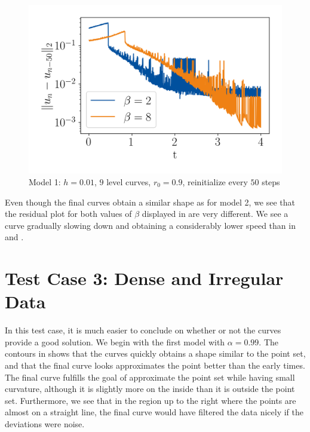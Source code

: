 \begin{figure}
    \centering
    \includegraphics[width=.6\linewidth]{figures/Results/Three-points/model3/b2_b8_res-t4.png}
    \caption[Model 3 - Triangle, Residuals]{Model 1: $h=0.01$, $9$ level curves, $r_0=0.9$, reinitialize every $50$ steps}
    \label{fig:m3-three-res}
\end{figure}


Even though the final curves obtain a similar shape as for model 2, we see that the residual plot for both values of $\beta$ displayed in  are very different. We see a curve gradually slowing down and obtaining a considerably lower speed than in  and . 

\clearpage
\section{Test Case 3: Dense and Irregular Data}
In this test case, it is much easier to conclude on whether or not the curves provide a good solution. We begin with the first model with $\alpha=0.99$. The contours in  shows that the curves quickly obtains a shape similar to the point set, and that the final curve looks approximates the point better than the early times. The final curve fulfills the goal of approximate the point set while having small curvature, although it is slightly more on the inside than it is outside the point set. Furthermore, we see that in the region up to the right where the points are almost on a straight line, the final curve would have filtered the data nicely if the deviations were noise. 

